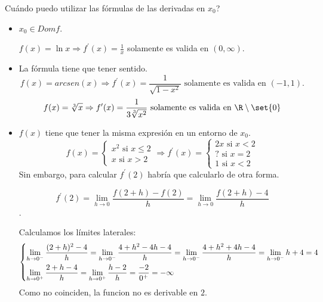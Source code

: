Cuándo puedo utilizar las fórmulas de las derivadas en \(x_0\)?
\begin{itemize}
	\item \(x_0 \in Domf \).
	      
	      \(f(x) = \ln x \Rightarrow f^\prime (x) = \frac{1}{x}\) solamente es valida en \((0,\infty )\).
	      
	\item La fórmula tiene que tener sentido.
	      \[
		      f(x) = arcsen(x) \Rightarrow f^\prime (x) = \frac{1}{\sqrt{1 - x^{2} } } \text{ solamente es valida en } (-1,1).
	      \]
	      \[
		      f(x) = \sqrt[3]{x} \Rightarrow f^\prime (x) = \frac{1}{3 \sqrt[3]{x^{2} } } \text{ solamente es valida en } \R \setminus \set{0}
	      \]
	\item \(f(x )\) tiene que tener la misma expresión en un entorno de \(x_0 \).
	      \[
		      f(x) = \begin{cases}
			      x^{2} \text{ si } x \leq 2 \\
			      x \text{ si } x > 2
		      \end{cases} \Rightarrow f^\prime (x) = \begin{cases}
			      2x \text{ si } x < 2 \\
			      ? \text{ si } x = 2  \\
			      1 \text{ si } x < 2
		      \end{cases}
	      \]
	      Sin embargo, para calcular \(f^\prime (2 )\) habría que calcularlo de otra forma.
	      
	      \[
		      f^\prime (2) = \lim\limits_{h  \to 0 } \frac{f(2 + h) - f(2)}{h } = \lim\limits_{h  \to 0 } \frac{f(2 + h) - 4 }{h }
	      \].
	      
	      Calculamos los límites laterales:
	      \[
		      \begin{dcases}
			      \lim\limits_{h  \to 0^{-}  } \frac{(2 + h)^{2} - 4 }{h} = \lim\limits_{h  \to 0^{- } } \frac{4 + h^{2} - 4h - 4 }{h} = \lim\limits_{h  \to 0^{-}  } \frac{4 + h^{2} + 4h - 4}{h} = \lim\limits_{h  \to 0^{-} } h + 4 = 4 \\
			      \lim\limits_{h  \to 0^{+}  } \frac{2 + h - 4}{h } = \lim\limits_{h  \to 0^{+} } \frac{h - 2}{h } = \frac{-2}{0^{+} } = -\infty
		      \end{dcases}
	      \]
	      Como no coinciden, la funcion no es derivable en \(2\).
\end{itemize}
